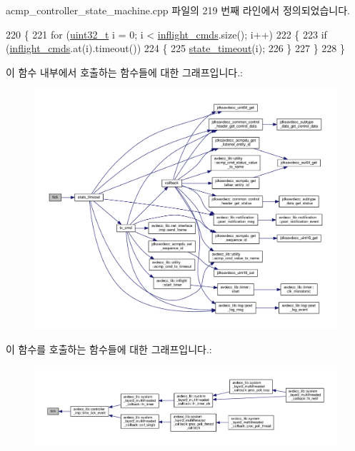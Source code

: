 acmp\+\_\+controller\+\_\+state\+\_\+machine.\+cpp 파일의 219 번째 라인에서 정의되었습니다.


\begin{DoxyCode}
220 \{
221     \textcolor{keywordflow}{for} (\hyperlink{parse_8c_a6eb1e68cc391dd753bc8ce896dbb8315}{uint32\_t} i = 0; i < \hyperlink{classavdecc__lib_1_1acmp__controller__state__machine_a0475b054c1890c88809394d9cef2a4c0}{inflight\_cmds}.size(); i++)
222     \{
223         \textcolor{keywordflow}{if} (\hyperlink{classavdecc__lib_1_1acmp__controller__state__machine_a0475b054c1890c88809394d9cef2a4c0}{inflight\_cmds}.at(i).timeout())
224         \{
225             \hyperlink{classavdecc__lib_1_1acmp__controller__state__machine_a1e6e8844609ddaee9d544e95210c495c}{state\_timeout}(i);
226         \}
227     \}
228 \}
\end{DoxyCode}


이 함수 내부에서 호출하는 함수들에 대한 그래프입니다.\+:
\nopagebreak
\begin{figure}[H]
\begin{center}
\leavevmode
\includegraphics[width=350pt]{classavdecc__lib_1_1acmp__controller__state__machine_a873dd91783f9efb4a590aded1f70d6b0_cgraph}
\end{center}
\end{figure}




이 함수를 호출하는 함수들에 대한 그래프입니다.\+:
\nopagebreak
\begin{figure}[H]
\begin{center}
\leavevmode
\includegraphics[width=350pt]{classavdecc__lib_1_1acmp__controller__state__machine_a873dd91783f9efb4a590aded1f70d6b0_icgraph}
\end{center}
\end{figure}


